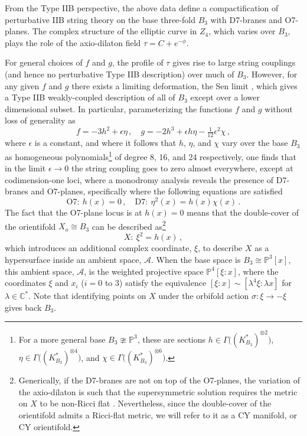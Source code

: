 \documentclass[a4paper,12pt]{article}
\numberwithin{equation}{section}
\newcommand{\mc}{\mathcal}
\newcommand{\mbb}{\mathbb}
\newcommand{\be}{\begin{equation}}
\newcommand{\ee}{\end{equation}}
\newcommand{\fthb}{B_3}				%
\newcommand{\canb}[1]{K_{#1}}			%
\newcommand{\cyu}{X}					%
\newcommand{\cyo}{X_o}				%
\newcommand{\ori}{\sigma}				%
\newcommand{\as}{\mc{A}}				%
\begin{document}
From the Type IIB perspective, the above data define a compactification of perturbative IIB string theory on the base three-fold $\fthb$ with D7-branes and O7-planes. The complex structure of the elliptic curve in $Z_4$, which varies over $\fthb$, plays the role  of the axio-dilaton field $\tau = C + e^{-\phi}$.

For general choices of $f$ and $g$, the profile of $\tau$ gives rise to large string couplings (and hence no perturbative Type IIB description) over much of $\fthb$. However, for any given $f$ and $g$ there exists a limiting deformation, the Sen limit \cite{Sen-limit}, which gives a Type IIB weakly-coupled description of all of $\fthb$ except over a lower dimensional subset. In particular, parameterizing the functions $f$ and $g$ without loss of generality as
\be
f = -3h^2 + \epsilon \eta \,, \quad g = -2h^3 + \epsilon h \eta - \tfrac{1}{12}\epsilon^2 \chi \,,
\ee
where $\epsilon$ is a constant, and where it follows that $h$, $\eta$, and $\chi$ vary over the base $\fthb$ as homogeneous polynomials\footnote{For a more general base $\fthb \ncong \mbb{P}^3$, these are sections $h \in \Gamma\big((\canb{\fthb}^*)^{\otimes 2}\big)$, $\eta \in \Gamma\big((\canb{\fthb}^*)^{\otimes 4}\big)$, and $\chi \in \Gamma\big((\canb{\fthb}^*)^{\otimes 6}\big)$.} of degree 8, 16, and 24 respectively, one finds that in the limit $\epsilon \to 0$ the string coupling goes to zero almost everywhere, except at codimension-one loci, where a monodromy analysis reveals the presence of D7-branes and O7-planes, specifically where the following equations are satisfied
\be
\mathrm{O7}:~h(x)=0 \,, \quad \mathrm{D7}:~\eta^2(x)=h(x)\chi(x) \,.
\label{eq:o7_and_d7_loci}
\ee
The fact that the O7-plane locus is at $h(x)=0$ means that the double-cover of the orientifold $\cyo \cong \fthb$ can be described as\footnote{Generically, if the D7-branes are not on top of the O7-planes, the variation of the axio-dilaton is such that the supersymmetric solution requires the metric on $X$ to be non-Ricci flat \cite{Grana:2001xn}. Nevertheless, since the double-cover of the orientifold admits a Ricci-flat metric, we will refer to it as a CY manifold, or CY orientifold.} 
\be
\cyu: ~ \xi^2 = h(x) \,,
\label{eq:cy_eqn}
\ee
which introduces an additional complex coordinate, $\xi$, to describe $\cyu$ as a hypersurface inside an ambient space, $\as$. When the base space is $\fthb \cong \mbb{P}^3[x]$, this ambient space, $\as$, is the weighted projective space $\mbb{P}^4[\xi:x]$, where the coordinates $\xi$ and $x_i$ ($i=0$ to $3$) satisfy the equivalence $[\xi:x] \sim [\lambda^4 \xi: \lambda x]$ for $\lambda \in \mbb{C}^*$. Note that identifying points on $\cyu$ under the orbifold action $\ori: \xi \to -\xi$ gives back $\fthb$. 
\end{document}
